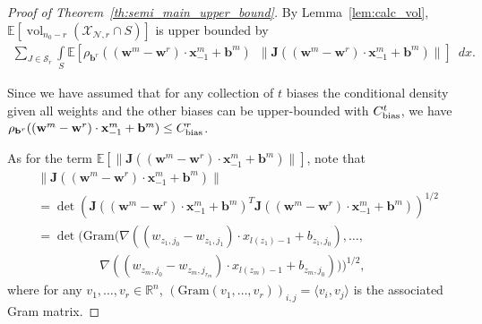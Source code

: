 \documentclass{article}
\theoremstyle{definition}
\newcommand{\net}{\mathcal{N}}
\newcommand{\nin}{n_0}
\newcommand{\vol}{\operatorname{vol}}
\begin{document}
\semimainupperboundtheorem*
\begin{proof}[Proof of Theorem~\ref{th:semi_main_upper_bound}]
    By Lemma~\ref{lem:calc_vol}, $\mathbb{E}\left[\vol_{\nin - r}(\mathcal{X}_{\net, r} \cap S) \right]$ is upper bounded by
    \begin{align*}
        \sum_{ J \in\mathcal{S}_r} \int\limits_{S} \mathbb{E} \left[ \rho_{\mathbf{b}^r}((\mathbf{w}^m - \mathbf{w}^r) \cdot \mathbf{x}^m_{-1} + \mathbf{b}^m) \enspace \|\mathbf{J} ((\mathbf{w}^m - \mathbf{w}^r) \cdot \mathbf{x}^m_{-1} + \mathbf{b}^m)\| \right] \enspace d x. 
    \end{align*}
    
    Since we have assumed that for any collection of $t$ biases the conditional density given all weights and the other biases can be upper-bounded with $C_{\text{\normalfont bias}}^t$, we have $\rho_{\mathbf{b}^r}((\mathbf{w}^m - \mathbf{w}^r) \cdot \mathbf{x}^m_{-1} + \mathbf{b}^m) \leq C_{\text{\normalfont bias}}^r$. 
    
    As for the term $\mathbb{E}[\|\mathbf{J} ((\mathbf{w}^m - \mathbf{w}^r) \cdot \mathbf{x}^m_{-1} + \mathbf{b}^m)\|]$, note that 
    \begin{align}
        &\|\mathbf{J} ((\mathbf{w}^m - \mathbf{w}^r) \cdot \mathbf{x}^m_{-1} + \mathbf{b}^m)\| \nonumber\\
        &= \det\left( \mathbf{J} ((\mathbf{w}^m - \mathbf{w}^r) \cdot \mathbf{x}^m_{-1} + \mathbf{b}^m)^T
        \mathbf{J} ((\mathbf{w}^m - \mathbf{w}^r) \cdot \mathbf{x}^m_{-1} + \mathbf{b}^m) \right)^{1/2} \nonumber\\
        &= \det \big( \text{Gram} \big( \nabla((w_{z_1, j_0} - w_{z_1, j_1}) \cdot x_{l(z_1)-1} + b_{z_1, j_0}), \dots, \nonumber\\
        & \hspace{60pt} \nabla((w_{z_m, j_0} - w_{z_m, j_{r_m}}) \cdot x_{l(z_m)-1} + b_{z_m, j_0}) \big) \big)^{1/2}, 
        \label{eq:gram}
    \end{align}
    where for any $v_1,\ldots, v_r \in \mathbb{R}^n$,
  $(\text{Gram}(v_1, \dots, v_r))_{i, j} = \langle v_i, v_j \rangle$
    is the associated Gram matrix.
    

\end{proof}
\end{document}

